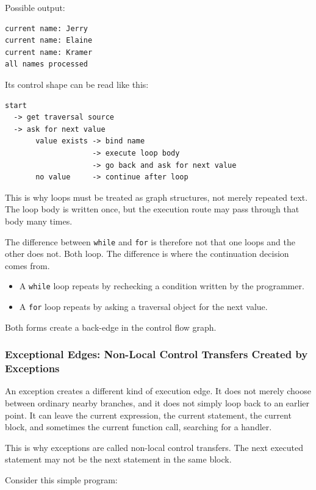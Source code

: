 \documentclass[a4paper,twoside]{report}
\begin{document}
Possible output:

\begin{verbatim}
current name: Jerry
current name: Elaine
current name: Kramer
all names processed
\end{verbatim}

Its control shape can be read like this:

\begin{verbatim}
start
  -> get traversal source
  -> ask for next value
       value exists -> bind name
                    -> execute loop body
                    -> go back and ask for next value
       no value     -> continue after loop
\end{verbatim}

This is why loops must be treated as graph structures, not merely repeated text. The loop body is written once, but the execution route may pass through that body many times.

The difference between \texttt{while} and \texttt{for} is therefore not that one loops and the other does not. Both loop. The difference is where the continuation decision comes from.

\begin{itemize}
    \item A \texttt{while} loop repeats by rechecking a condition written by the programmer.
    \item A \texttt{for} loop repeats by asking a traversal object for the next value.
\end{itemize}

Both forms create a back-edge in the control flow graph.

\subsubsection{Exceptional Edges: Non-Local Control Transfers Created by Exceptions}

An exception creates a different kind of execution edge. It does not merely choose between ordinary nearby branches, and it does not simply loop back to an earlier point. It can leave the current expression, the current statement, the current block, and sometimes the current function call, searching for a handler.

This is why exceptions are called non-local control transfers. The next executed statement may not be the next statement in the same block.

Consider this simple program:
\end{document}
